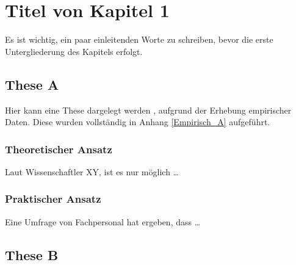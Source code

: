 \chapter{Titel von Kapitel 1}
\label{cah:Kap1}

Es ist wichtig, ein paar einleitenden Worte zu schreiben, bevor die erste Untergliederung des Kapitels erfolgt.

\section{These A}
\label{sec:TheseA}

Hier kann eine These dargelegt werden , aufgrund der Erhebung empirischer Daten. Diese wurden vollständig in Anhang \ref{Empirisch_A} aufgeführt.

\subsection*{Theoretischer Ansatz}
 Laut Wissenschaftler XY, ist es nur möglich \dots
 
\subsection*{Praktischer Ansatz}
 Eine Umfrage von Fachpersonal hat ergeben, dass \dots
 
 \section{These B}
 

